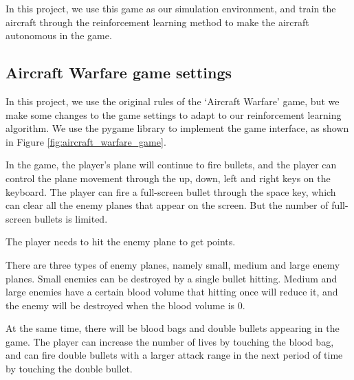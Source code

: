 \documentclass{article}
\begin{document}
    In this project, we use this game as our simulation environment, and train the aircraft through the reinforcement learning method to make the aircraft autonomous in the game.

    \subsection{Aircraft Warfare game settings}


    In this project, we use the original rules of the `Aircraft Warfare' game, but we make some changes to the game settings to adapt to our reinforcement learning algorithm. We use the pygame library to implement the game interface, as shown in Figure \ref{fig:aircraft_warfare_game}. 


    In the game, the player's plane will continue to fire bullets, and the player can control the plane movement through the up, down, left and right keys on the keyboard. The player can fire a full-screen bullet through the space key, which can clear all the enemy planes that appear on the screen. But the number of full-screen bullets is limited.



    The player needs to hit the enemy plane to get points.

    There are three types of enemy planes, namely small, medium and large enemy planes. Small enemies can be destroyed by a single bullet hitting. Medium and large enemies have a certain blood volume that hitting once will reduce it, and the enemy will be destroyed when the blood volume is 0. 
    
    At the same time, there will be blood bags and double bullets appearing in the game. The player can increase the number of lives by touching the blood bag, and can fire double bullets with a larger attack range in the next period of time by touching the double bullet.
\end{document}
